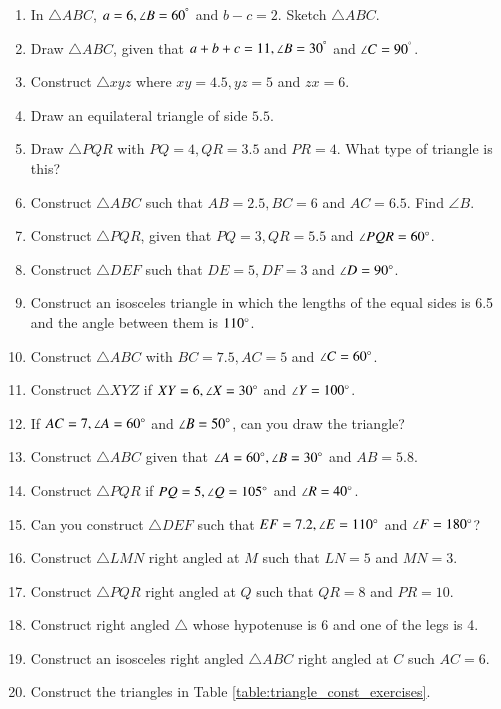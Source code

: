 \begin{enumerate}[label=\thesection.\arabic*.,ref=\thesection.\theenumi]
\item In $\triangle ABC$,  $a = 6, \angle B = 60^{\degree}$ and $b-c = 2$. 
Sketch $\triangle ABC$.
\item Draw $\triangle ABC$,  given that $a+b+c = 11, \angle B = 30^{\degree}$ and $\angle C = 90^{\degree}$.
\item Construct $\triangle xyz$ where $xy = 4.5, yz = 5$ and $zx = 6$.
\item Draw an equilateral triangle of side $5.5$.
\item Draw $\triangle PQR$ with $PQ = 4, QR = 3.5$ and $PR = 4$.  What type of triangle is this?
\item Construct $\triangle ABC$ such that $AB = 2.5, BC = 6$ and $AC = 6.5$.  Find $\angle B$.
\item Construct $\triangle PQR$, given that $PQ = 3, QR = 5.5$ and $\angle PQR = 60 \degree$.
\item Construct $\triangle DEF$ such that $DE = 5, DF = 3$ and $\angle D = 90\degree$.
\item Construct an isosceles triangle in which the lengths of the equal sides is 6.5 and the angle between them is $110\degree$.
\item Construct $\triangle ABC$  with $BC = 7.5, AC = 5$ and $\angle C = 60\degree$.
\item Construct $\triangle XYZ$ if $XY = 6, \angle X = 30\degree$ and $\angle Y = 100 \degree$.
\item If $AC = 7, \angle A = 60\degree$ and $\angle B = 50 \degree$, can you draw the triangle?
\item Construct $\triangle ABC$ given that $\angle A = 60\degree, \angle B = 30\degree$ and $AB = 5.8$.
\item Construct $\triangle PQR$ if $PQ = 5, \angle Q = 105 \degree$ and $\angle R = 40 \degree$.
\item Can you construct $\triangle DEF$ such that $EF = 7.2, \angle E = 110\degree$ and $\angle F = 180\degree$?
\item Construct  $\triangle LMN$ right angled at $M$ such that $LN = 5$ and $MN = 3$.
\item Construct  $\triangle PQR$ right angled at $Q$ such that $QR = 8$ and $PR = 10$.
\item Construct  right angled $\triangle $ whose hypotenuse  is 6 and one of the legs is 4.
\item Construct  an isosceles right angled $\triangle ABC$ right angled at $C$ such $AC = 6$.
\item Construct the  triangles in Table \ref{table:triangle_const_exercises}.
\begin{table}[!ht]

\caption{}
\label{table:triangle_const_exercises}
\end{table}

\end{enumerate}
%
